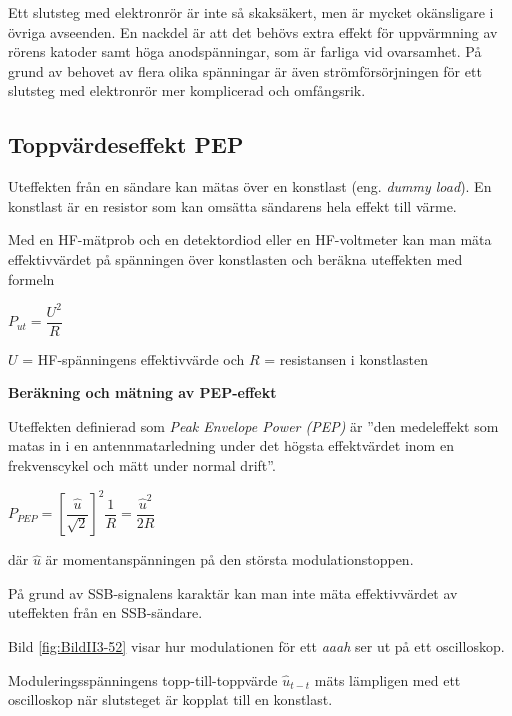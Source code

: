 Ett slutsteg med elektronrör är inte så skaksäkert, men är mycket okänsligare
i övriga avseenden.
En nackdel är att det behövs extra effekt för uppvärmning av rörens katoder
samt höga anodspänningar, som är farliga vid ovarsamhet.
På grund av behovet av flera olika spänningar är även strömförsörjningen för
ett slutsteg med elektronrör mer komplicerad och omfångsrik.

\subsection{Toppvärdeseffekt PEP}
\label{PEP-effekt}

Uteffekten från en sändare kan mätas över en konstlast (eng. \emph{dummy load}).
En konstlast är en resistor som kan omsätta sändarens hela effekt till värme.

Med en HF-mätprob och en detektordiod eller en HF-voltmeter kan man mäta
effektivvärdet på spänningen över konstlasten och beräkna uteffekten med
formeln

\(P_{ut} = \dfrac{U^2}{R}\)

\(U\) = HF-spänningens effektivvärde och 
\(R\) = resistansen i konstlasten

\textbf{Beräkning och mätning av PEP-effekt}

Uteffekten definierad som \emph{Peak Envelope Power (PEP)} \cite[1.157]{ITU-RR}
är ''den medeleffekt som matas in i en antennmatarledning under det högsta
effektvärdet inom en frekvenscykel och mätt under normal drift''.

\(P_{PEP} = \left[\dfrac{\hat{u}}{\sqrt{2}}\right]^2\dfrac{1}{R} =  \dfrac{\hat{u}^2}{2R}\)

där \(\hat{u}\) är momentanspänningen på den största modulationstoppen.


På grund av SSB-signalens karaktär kan man inte mäta effektivvärdet av
uteffekten från en SSB-sändare.

Bild \ref{fig:BildII3-52} visar hur modulationen för ett \emph{aaah} ser ut
på ett oscilloskop.

Moduleringsspänningens topp-till-topp\-värde \(\hat{u}_{t-t}\) mäts lämpligen med ett
oscilloskop när slutsteget är kopplat till en konstlast.

